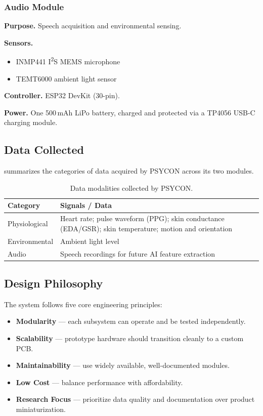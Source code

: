 \subsubsection{Audio Module}
\label{sec:audio-module}

\textbf{Purpose.} Speech acquisition and environmental sensing.

\textbf{Sensors.}
\begin{itemize}
    \item INMP441 I\textsuperscript{2}S MEMS microphone
    \item TEMT6000 ambient light sensor
\end{itemize}

\textbf{Controller.} ESP32 DevKit (30-pin).

\textbf{Power.} One 500\,mAh LiPo battery, charged and protected via a TP4056 USB-C charging module.

\subsection{Data Collected}
\label{sec:data-collected}

 summarizes the categories of data acquired by PSYCON across its two modules.

\begin{table}[H]
\centering
\caption{Data modalities collected by PSYCON.}
\label{tab:data-collected}
\small
\begin{tabularx}{\columnwidth}{@{}l Y@{}}
\toprule
\textbf{Category} & \textbf{Signals / Data} \\
\midrule
Physiological & Heart rate; pulse waveform (PPG); skin conductance (EDA/GSR); skin temperature; motion and orientation \\
Environmental & Ambient light level \\
Audio & Speech recordings for future AI feature extraction \\
\bottomrule
\end{tabularx}
\end{table}

\subsection{Design Philosophy}
\label{sec:design-philosophy}

The system follows five core engineering principles:

\begin{itemize}
    \item \textbf{Modularity} --- each subsystem can operate and be tested independently.
    \item \textbf{Scalability} --- prototype hardware should transition cleanly to a custom PCB.
    \item \textbf{Maintainability} --- use widely available, well-documented modules.
    \item \textbf{Low Cost} --- balance performance with affordability.
    \item \textbf{Research Focus} --- prioritize data quality and documentation over product miniaturization.
\end{itemize}

